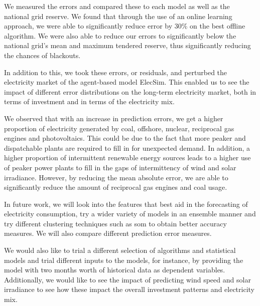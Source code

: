 We measured the errors and compared these to each model as well as the national grid reserve. We found that through the use of an online learning approach, we were able to significantly reduce error by 30\% on the best offline algorithm.  We were also able to reduce our errors to significantly below the national grid's mean and maximum tendered reserve, thus significantly reducing the chances of blackouts.

In addition to this, we took these errors, or residuals, and perturbed the electricity market of the agent-based model ElecSim. This enabled us to see the impact of different error distributions on the long-term electricity market, both in terms of investment and in terms of the electricity mix.

We observed that with an increase in prediction errors, we get a higher proportion of electricity generated by coal, offshore, nuclear, reciprocal gas engines and photovoltaics. This could be due to the fact that more peaker and dispatchable plants are required to fill in for unexpected demand. In addition, a higher proportion of intermittent renewable energy sources leads to a higher use of peaker power plants to fill in the gaps of intermittency of wind and solar irradiance. However, by reducing the mean absolute error, we are able to significantly reduce the amount of reciprocal gas engines and coal usage.


In future work, we will look into the features that best aid in the forecasting of electricity consumption, try a wider variety of models in an ensemble manner and try different clustering techniques such as \acrfull{som} to obtain better accuracy measures. We will also compare different prediction error measures. 

We would also like to trial a different selection of algorithms and statistical models and trial different inputs to the models, for instance, by providing the model with two months worth of historical data as dependent variables. Additionally, we would like to see the impact of predicting wind speed and solar irradiance to see how these impact the overall investment patterns and electricity mix. 























